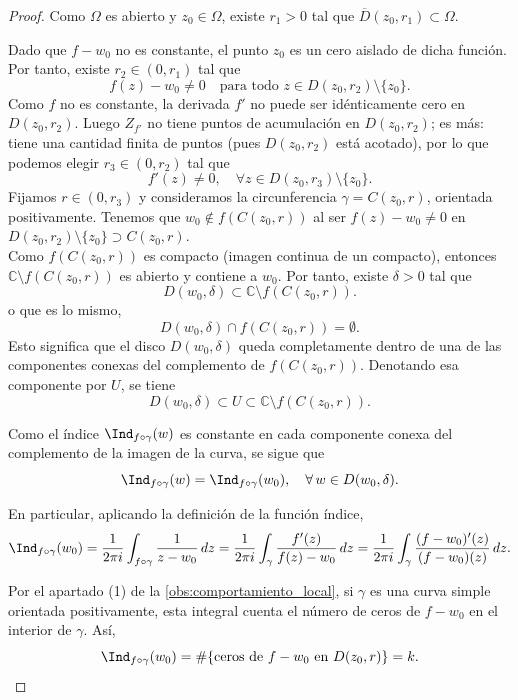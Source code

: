 \begin{proof}
    Como $\Omega$ es abierto y $z_0 \in \Omega$, existe $r_1 > 0$ tal que $\overline{D}(z_0, r_1) \subset \Omega$.

    Dado que $f - w_0$ no es constante, el punto $z_0$ es un cero aislado de dicha función. Por tanto, existe $r_2 \in (0, r_1)$ tal que
    \[
        f(z) - w_0 \neq 0 \quad \text{para todo } z \in D(z_0, r_2) \setminus \{z_0\}.
    \]
    Como $f$ no es constante, la derivada $f'$ no puede ser idénticamente cero en $D(z_0, r_2)$. Luego $Z_{f'}$ no tiene puntos de acumulación en $D(z_0, r_2)$; es más: tiene una cantidad finita de puntos (pues $D(z_0,r_2)$ está acotado), por lo que podemos elegir $r_3 \in (0, r_2)$ tal que
    \[
        f'(z) \neq 0, \quad \forall z \in D(z_0, r_3) \setminus \{z_0\}.
    \]
    Fijamos $r \in (0, r_3)$ y consideramos la circunferencia $\gamma = C(z_0, r)$, orientada positivamente.  
    Tenemos que $w_0 \notin f(C(z_0, r))$ al ser $f(z) - w_0 \neq 0$ en $D(z_0, r_2) \setminus \{z_0\} \supset C(z_0, r)$.\\
    Como $f(C(z_0, r))$ es compacto (imagen continua de un compacto), entonces $\mathbb{C} \setminus f(C(z_0, r))$ es abierto y contiene a $w_0$. Por tanto, existe $\delta > 0$ tal que
    \[
        D(w_0, \delta) \subset \mathbb{C} \setminus f(C(z_0, r)).
    \]
    o que es lo mismo,
    \[
        D(w_0, \delta) \cap f(C(z_0, r)) = \emptyset.
    \]
    Esto significa que el disco $D(w_0, \delta)$ queda completamente dentro de una de las componentes conexas del complemento de $f(C(z_0, r))$. Denotando esa componente por $U$, se tiene
    \[
        D(w_0, \delta) \subset U \subset \mathbb{C} \setminus f(C(z_0, r)).
    \]

    Como el índice $\Ind_{f \circ \gamma}(w)$ es constante en cada componente conexa del complemento de la imagen de la curva, se sigue que
    \[
        \Ind_{f \circ \gamma}(w) = \Ind_{f \circ \gamma}(w_0), \quad \forall\, w \in D(w_0, \delta).
    \]

    En particular, aplicando la definición de la función índice,
    \[
        \Ind_{f \circ \gamma}(w_0)
        = \frac{1}{2\pi i} \int_{f \circ \gamma} \frac{1}{z - w_0} \, dz
        = \frac{1}{2\pi i} \int_\gamma \frac{f'(z)}{f(z) - w_0} \, dz
        = \frac{1}{2\pi i} \int_\gamma \frac{(f - w_0)'(z)}{(f - w_0)(z)} \, dz.
    \]

    Por el apartado (1) de la \cref{obs:comportamiento_local}, si $\gamma$ es una curva simple orientada positivamente, esta integral cuenta el número de ceros de $f - w_0$ en el interior de $\gamma$. Así,
    \[
        \Ind_{f \circ \gamma}(w_0)
        = \# \{ \text{ceros de } f - w_0 \text{ en } D(z_0, r) \}
        = k.
    \]


\end{proof}
